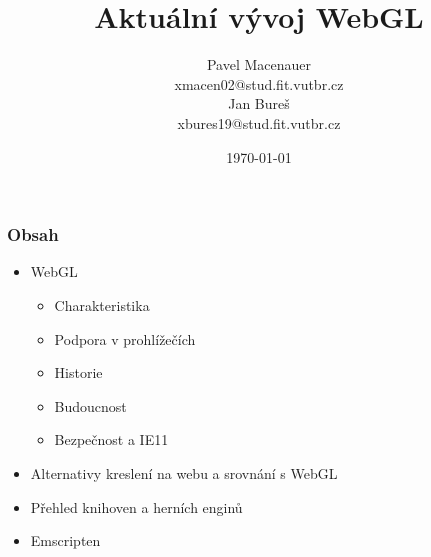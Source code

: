 \documentclass{beamer}
\title{\textbf{Aktuální vývoj WebGL}}
\author{
	\large{Pavel Macenauer} \\ 
	\tiny{xmacen02@stud.fit.vutbr.cz} \\ 
	\large{Jan Bureš} \\ 
	\tiny{xbures19@stud.fit.vutbr.cz}
}
\date{\tiny{\today}}
\institute[FIT VUTBR]
{
	\inst{}
	Fakulta Informačních Technologií \\
	Vysoké Učení Technické v Brně
}
\begin{document}
	\begin{frame}[t,plain]
	\titlepage
	\tableofcontents[currentsection]
	\vspace{-10mm}
	\end{frame}


	\begin{frame}[t,fragile]
		\frametitle{Obsah}	
		
		\begin{itemize}
			\item WebGL
			\begin{itemize}
				\item Charakteristika
				\item Podpora v prohlížečích
				\item Historie
				\item Budoucnost
				\item Bezpečnost a IE11				
			\end{itemize}
			\item Alternativy kreslení na webu a srovnání s WebGL
			\item Přehled knihoven a herních enginů
			\item Emscripten
		\end{itemize}			
				
	\end{frame}
	


	{
\begin{frame}[plain]
\end{frame}
}
	
\end{document}
